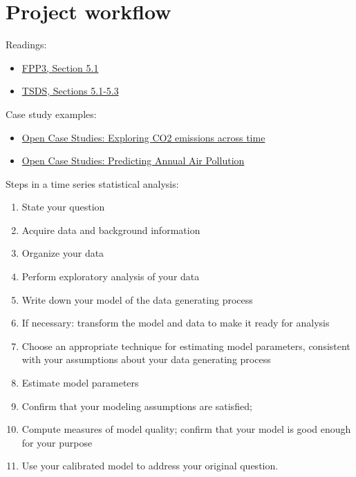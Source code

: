 \documentclass[
]{book}
\providecommand{\tightlist}{%
  \setlength{\itemsep}{0pt}\setlength{\parskip}{0pt}}
\begin{document}
\hypertarget{project-workflow}{%
\chapter{Project workflow}\label{project-workflow}}

Readings:

\begin{itemize}
\tightlist
\item
  \href{https://otexts.com/fpp3/a-tidy-forecasting-workflow.html}{FPP3, Section 5.1}
\item
  \href{https://jhudatascience.org/tidyversecourse/model.html\#about-this-course-4}{TSDS, Sections 5.1-5.3}
\end{itemize}

Case study examples:

\begin{itemize}
\tightlist
\item
  \href{https://www.opencasestudies.org/ocs-bp-co2-emissions/}{Open Case Studies: Exploring CO2 emissions across time}
\item
  \href{https://www.opencasestudies.org/ocs-bp-air-pollution/}{Open Case Studies: Predicting Annual Air Pollution}
\end{itemize}

Steps in a time series statistical analysis:

\begin{enumerate}
\def\labelenumi{\arabic{enumi}.}
\tightlist
\item
  State your question
\item
  Acquire data and background information
\item
  Organize your data
\item
  Perform exploratory analysis of your data
\item
  Write down your model of the data generating process
\item
  If necessary: transform the model and data to make it ready for analysis
\item
  Choose an appropriate technique for estimating model parameters, consistent with your assumptions about your data generating process
\item
  Estimate model parameters
\item
  Confirm that your modeling assumptions are satisfied;
\item
  Compute measures of model quality; confirm that your model is good enough for your purpose
\item
  Use your calibrated model to address your original question.
\end{enumerate}
\end{document}
